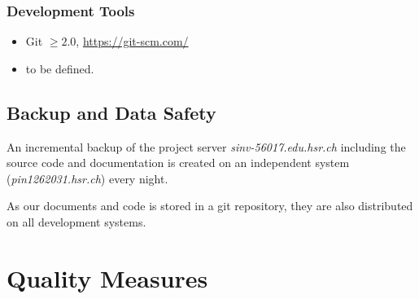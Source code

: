 \documentclass[a4paper]{article}
\begin{document}
\subsubsection{Development Tools}

\begin{itemize}
	\item Git $\geq 2.0$, \url{https://git-scm.com/}
	\item to be defined. %
\end{itemize}

\subsection{Backup and Data Safety}

An incremental backup of the project server \textit{sinv-56017.edu.hsr.ch} including the source code and documentation is created on an independent system (\textit{pin1262031.hsr.ch}) every night.

As our documents and code is stored in a git repository, they are also distributed on all development systems.



\section{Quality Measures}



\end{document}
